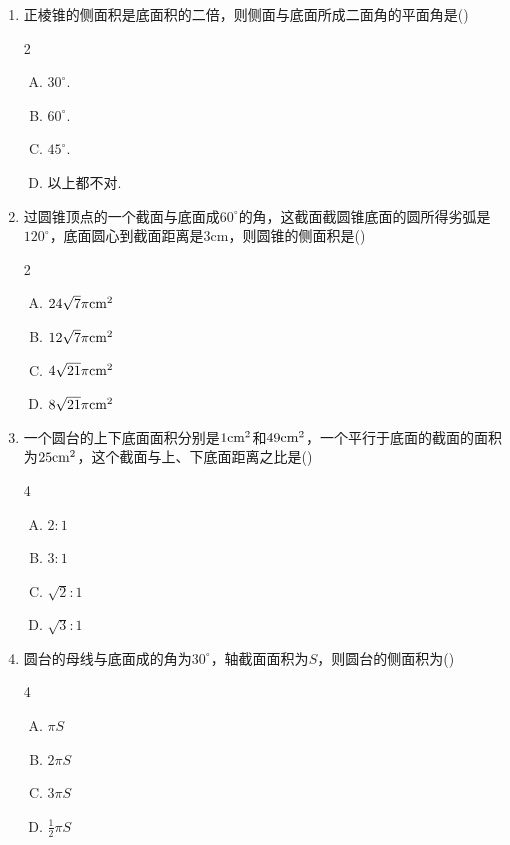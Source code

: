 \begin{enumerate}
\item 正棱锥的侧面积是底面积的二倍，则侧面与底面所成二面角的平面角是\hfill (\quad )
\begin{multicols}{2}
\begin{enumerate}[(A)]
\item $30^{\circ}$.
\item $60^{\circ}$.
\item $45^{\circ}$.
\item 以上都不对.
\end{enumerate}
\end{multicols}

\item 过圆锥顶点的一个截面与底面成$60^{\circ}$的角，这截面截圆锥底面的圆所得劣弧是$120^{\circ}$，底面圆心到截面距离是3cm，则圆锥的侧面积是\hfill (\quad )
\begin{multicols}{2}
\begin{enumerate}[(A)]
    \item $24\sqrt{7}\pi {\rm cm^2}$
    \item $12\sqrt{7}\pi {\rm cm^2}$
    \item $4\sqrt{21}\pi {\rm cm^2}$
    \item $8\sqrt{21}\pi {\rm cm^2}$
\end{enumerate}    
\end{multicols}


\item 一个圆台的上下底面面积分别是$1{\rm cm^2}$和$49{\rm cm^2}$，一个平行于底面的截面的面积为$25{\rm cm^2}$，这个截面与上、下底面距离之比是\hfill (\quad )
\begin{multicols}{4}
  \begin{enumerate}[(A)]
    \item $2:1$
\item $3:1$
\item $\sqrt{2}:1$
\item $\sqrt{3}:1$
\end{enumerate}  
\end{multicols}


\item 圆台的母线与底面成的角为$30^{\circ}$，轴截面面积为$S$，则圆台的侧面积为\hfill (\quad )
\begin{multicols}{4}
 \begin{enumerate}[(A)]
\item $\pi S$
\item $2\pi S$
\item $3\pi S$
\item $\frac{1}{2}\pi S$
\end{enumerate}   
\end{multicols}



\end{enumerate}
